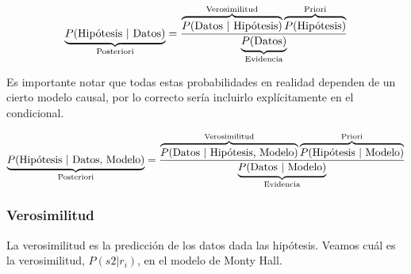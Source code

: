 \documentclass[a4paper,10pt]{book}
\theoremstyle{definition}
\begin{document}
\begin{equation*}
\underbrace{P(\text{Hip\'otesis }|\text{ Datos})}_{\text{\scriptsize Posteriori}} = \frac{\overbrace{P(\text{Datos }|\text{ Hip\'otesis})}^{\text{\scriptsize Verosimilitud}} \overbrace{P(\text{Hip\'otesis})}^{\text{\scriptsize Priori}} }{\underbrace{P(\text{Datos})}_{\text{\scriptsize Evidencia}}}
\end{equation*}

Es importante notar que todas estas probabilidades en realidad dependen de un cierto modelo causal, por lo correcto sería incluirlo explícitamente en el condicional.


\begin{equation*}
\underbrace{P(\text{Hip\'otesis }|\text{ Datos, Modelo})}_{\text{\scriptsize Posteriori}} = \frac{\overbrace{P(\text{Datos }|\text{ Hip\'otesis, Modelo})}^{\text{\scriptsize Verosimilitud}} \overbrace{P(\text{Hip\'otesis }|\text{ Modelo})}^{\text{\scriptsize Priori}} }{\underbrace{P(\text{Datos }|\text{ Modelo})}_{\text{\scriptsize Evidencia}}}
\end{equation*}

\subsubsection*{Verosimilitud}

La verosimilitud es la predicción de los datos dada las hipótesis.
Veamos cuál es la verosimilitud, $P(s2|r_i)$, en el modelo de Monty Hall.
\end{document}
